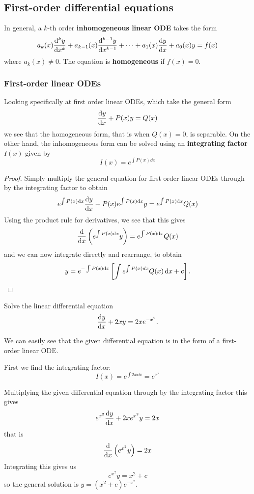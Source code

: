 \subsection{First-order differential equations}
In general, a $k$-th order \textbf{inhomogeneous linear ODE} takes the form
\[ a_k(x)\dv[k]{y}{x} + a_{k-1}(x)\dv[k-1]{y}{x} + \cdots + a_1(x)\dv{y}{x} + a_0(x)y = f(x) \]
where $a_k(x) \neq 0$. The equation is \textbf{homogeneous} if $f(x) = 0$. 

\subsubsection{First-order linear ODEs}
Looking specifically at first order linear ODEs, which take the general form
\[ \dv{y}{x} + P(x)y = Q(x) \]
we see that the homogeneous form, that is when $Q(x) = 0$, is separable. On the other hand, the inhomogeneous form can be solved using an \textbf{integrating factor} $I(x)$ given by
\[ I(x) = e^{\int P(x) \dd{x}} \]
\begin{proof}
Simply multiply the general equation for first-order linear ODEs through by the integrating factor to obtain
\[ e^{\int P(x) \dd{x}} \dv{y}{x} + P(x) e^{\int P(x) \dd{x}}y = e^{\int P(x) \dd{x}} Q(x) \]
Using the product rule for derivatives, we see that this gives
\[ \dv{}{x}\left(e^{\int P(x) \dd{x}}y\right) = e^{\int P(x) \dd{x}} Q(x) \]
and we can now integrate directly and rearrange, to obtain
\[ y = e^{-\int P(x) \dd{x}} \left[\int e^{\int P(x)dx} Q(x) \dd{x} + c\right]. \]
\end{proof}

\begin{exmp}{}{}
Solve the linear differential equation 
\[ \dv{y}{x} + 2xy = 2xe^{-x^2}. \]
\end{exmp}
\begin{solution}
We can easily see that the given differential equation is in the form of a first-order linear ODE.

First we find the integrating factor:
\[ I(x) = e^{\int 2x \dd{x}} = e^{x^2} \]

Multiplying the given differential equation through by the integrating factor this gives
\[ e^{x^2} \dv{y}{x} + 2xe^{x^2}y = 2x \]
that is
\[ \dv{}{x}\left(e^{x^2}y\right)= 2x \]
Integrating this gives us
\[ e^{x^2}y = x^2 + c \]
so the general solution is $y = (x^2+c)e^{-x^2}$.
\end{solution}


